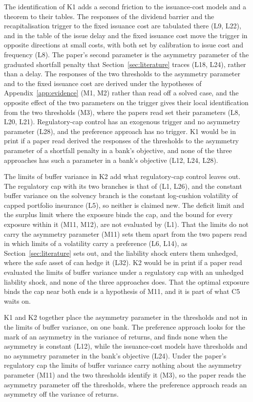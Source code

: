 The identification of K1 adds a second friction to the issuance-cost models
and a theorem to their tables. The responses of the dividend barrier and the
recapitalisation trigger to the fixed issuance cost are tabulated there (L9,
L22), and in the table of \citet{peura2006} the issue delay and the fixed
issuance cost move the trigger in opposite directions at small costs, with
both set by calibration to issue cost and frequency (L8). The paper's second
parameter is the asymmetry parameter of the graduated shortfall penalty that
Section~\ref{sec:literature} traces (L18, L24), rather than a delay. The responses of the two thresholds
to the asymmetry parameter and to the fixed issuance cost are derived under the
hypotheses of Appendix~\ref{app:evidence} (M1, M2) rather than read off a
solved case, and the opposite effect of the two parameters on the trigger gives
their local identification from the two thresholds (M3), where the papers read
set their parameters (L8, L20, L21). Regulatory-cap control has an exogenous trigger and no asymmetry
parameter (L28), and the preference approach has no trigger. K1 would be in
print if a paper read derived the responses of the thresholds to the asymmetry parameter of a
shortfall penalty in a bank's objective, and none of the three approaches has
such a parameter in a bank's objective (L12, L24, L28).

The limits of buffer variance in K2 add what regulatory-cap control leaves out. The
regulatory cap with its two branches is that of \citet{bayraktar2026} (L1,
L26), and the constant buffer variance on the solvency branch is the constant
log-cushion volatility of capped portfolio insurance (L5), so neither is
claimed new. The deficit limit and the surplus limit where the exposure binds
the cap, and the bound for every exposure within it (M11, M12), are not
evaluated by \citet{bayraktar2026} (L1). That the limits do not carry the
asymmetry parameter (M11) sets them apart from the two papers read in which
limits of a volatility carry a preference (L6, L14), as
Section~\ref{sec:literature} sets out, and the liability shock enters them
unhedged, where the safe asset of \citet{blackperold1992} can hedge it (L32). K2 would be in
print if a paper read evaluated the limits of buffer variance under a regulatory cap
with an unhedged liability shock, and none of the three approaches does. That the optimal
exposure binds the cap near both ends is a hypothesis of M11, and it is part of
what C5 waits on.

K1 and K2 together place the asymmetry parameter in the thresholds and not in
the limits of buffer variance, on one bank. The preference approach looks for the mark of
an asymmetry in the variance of returns, and finds none when the asymmetry is
constant (L12), while the issuance-cost models have thresholds and no
asymmetry parameter in the bank's objective (L24). Under the paper's regulatory
cap the limits of buffer variance carry nothing about the asymmetry parameter (M11) and
the two thresholds identify it (M3), so the paper reads the asymmetry
parameter off the thresholds, where the preference approach reads an asymmetry
off the variance of returns.

